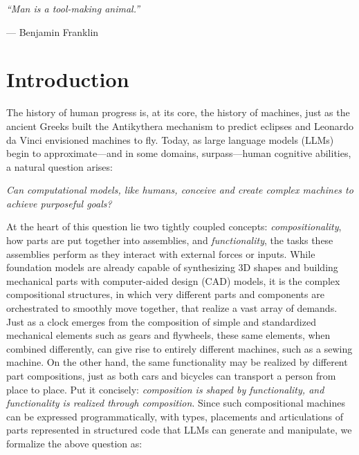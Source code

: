 \documentclass{article} %
\theoremstyle{plain}
\theoremstyle{definition}
\begin{document}
\vspace{-4.5mm}

\setlength\epigraphwidth{5cm}
\epigraph{\emph{``Man is a tool-making animal.''}}{--- \textup{Benjamin Franklin}}
\vspace{-7mm}

\vspace{-1.5mm}
\section{Introduction}
\vspace{-1.5mm}

The history of human progress is, at its core, the history of machines, just as the ancient Greeks built the Antikythera mechanism to predict eclipses and Leonardo da Vinci envisioned machines to fly. Today, as large language models (LLMs) begin to approximate---and in some domains, surpass---human cognitive abilities, a natural question arises: 


\vspace{-1.5mm}
\begin{mdframed}[leftmargin=1em, rightmargin=1em]
\fontsize{9.3pt}{\baselineskip} 
\itshape Can computational models, like humans, conceive and create complex machines to achieve purposeful goals?
\vspace{-.35mm}
\end{mdframed}
\vspace{-3.75mm}

At the heart of this question lie two tightly coupled concepts: \textit{compositionality}, how parts are put together into assemblies, and \textit{functionality}, the tasks these assemblies perform as they interact with external forces or inputs. While foundation models are already capable of synthesizing 3D shapes and building mechanical parts with computer-aided design (CAD) models, it is the complex compositional structures, in which very different parts and components are orchestrated to smoothly move together, that realize a vast array of demands.
Just as a clock emerges from the composition of simple and standardized mechanical elements such as gears and flywheels, these same elements, when combined differently, can give rise to entirely different machines, such as a sewing machine. On the other hand, the same functionality may be realized by different part compositions, just as both cars and bicycles can transport a person from place to place. Put it concisely: \textit{composition is shaped by functionality, and functionality is realized through composition}. Since such compositional machines can be expressed programmatically, with types, placements and articulations of parts represented in structured code that LLMs can generate and manipulate, we formalize the above question as:
\end{document}

